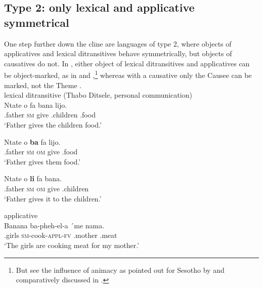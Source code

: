 \documentclass[output=paper]{LSP/langsci}
\begin{document}
\subsection{Type 2: only lexical and applicative symmetrical}\label{sec:vdw:2.2}

One step further down the cline are languages of type 2, where objects of applicatives and lexical ditransitives behave symmetrically, but objects of causatives do not. In , either object of lexical ditransitives and applicatives can be object-marked, as in  and ,\footnote{But see the influence of animacy as pointed out for Sesotho by \citet{MorolongHyman1977} and comparatively discussed in \citet{HymanDuranti1982}.} whereas with a causative only the Causee can be marked, not the Theme .\\

\noindent {} 
\ea\label{ex:vanderwal:9}%
 {lexical ditransitive (Thabo Ditsele, personal communication)}\\
 \ea\label{ex:vanderwal:9a}
\gll Ntate  o  fa  bana  lijo. \\
    .father  \textsc{sm}  give  .children  .food\\
    \glt ‘Father gives the children food.’

 \ex\label{ex:vanderwal:9b}
\gll Ntate  o  \textbf{ba}  fa  lijo.\\
    .father  \textsc{sm}  \textsc{om}  give  .food\\
    \glt ‘Father gives them food.’

 \ex\label{ex:vanderwal:9c}
\gll Ntate   o  \textbf{li}  fa  bana.\\
    .father  \textsc{sm}  \textsc{om}  give  .children\\
    \glt ‘Father gives it to the children.’
\z
\z

 \ea\label{ex:vanderwal:10} applicative \citep[24]{Machobane1989}\\
  \ea\label{ex:vanderwal:10a}
\gll Banana  ba-pheh-el-a  ´me  nama.\\
    .girls  \textsc{sm}{}-cook-\textsc{appl}{}-\textsc{fv}  .mother  .meat\\
    \glt ‘The girls are cooking meat for my mother.’
\end{document}
